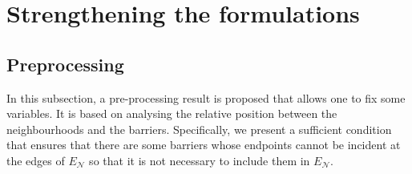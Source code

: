 \documentclass[a4paper,  review, authoryear, 1p.]{elsarticle}
\newcommand{\EN}{{E^{}_{\mathcal N}}}
\newcommand{\determinant}[3]{\det({#1|#2#3})}
\begin{document}
	
	\section{Strengthening the formulations}\label{section:strengthening}
	
	\subsection{Preprocessing}\label{subsection:preprocessing}
	In this subsection, a pre-processing result is proposed that allows one to fix some variables. It is based on analysing the relative position between the neighbourhoods and the barriers.
	Specifically, we present a sufficient condition that ensures that there are some barriers whose endpoints cannot be incident at the edges of $\EN$ so that it is not necessary to include them in $\EN$. 
	
\end{document}
